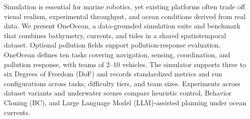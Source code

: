 Simulation is essential for marine robotics, yet existing platforms often trade off visual realism, experimental throughput, and ocean conditions derived from real data. We present OneOcean, a data-grounded simulation suite and benchmark that combines bathymetry, currents, and tides in a shared spatiotemporal dataset. Optional pollution fields support pollution-response evaluation. OneOcean defines ten tasks covering navigation, sensing, coordination, and pollution response, with teams of 2--10 vehicles. The simulator supports three to six Degrees of Freedom (DoF) and records standardized metrics and run configurations across tasks, difficulty tiers, and team sizes. Experiments across dataset variants and underwater scenes compare heuristic control, Behavior Cloning (BC), and Large Language Model (LLM)-assisted planning under ocean currents.

